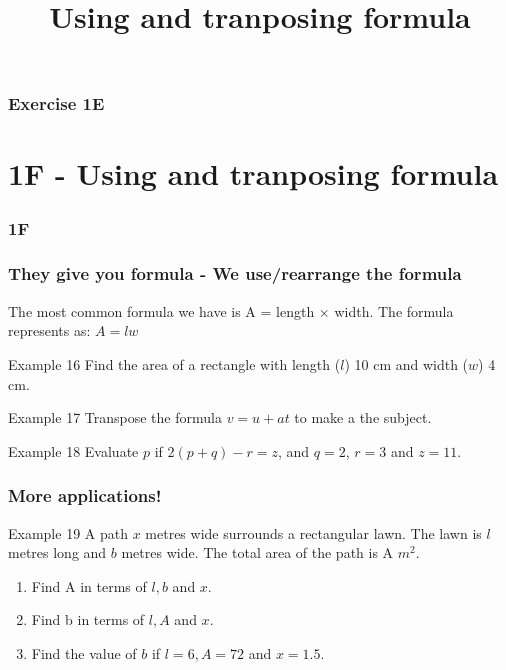 \documentclass{beamer}
\begin{document}
\begin{frame}
    \frametitle{Exercise 1E}
\end{frame}


\section{1F - Using and tranposing formula}
\begin{frame}
    \frametitle{1F}
    \begin{center}
        \title{Using and tranposing formula}
        \maketitle
    \end{center}
\end{frame}

\begin{frame}[t]
    \frametitle{They give you formula - We use/rearrange the formula}
    The most common formula we have is A = length $\times$ width. The formula represents as: $A = lw$
    \begin{block}{Example 16}
        Find the area of a rectangle with length ($l$) 10 cm and width ($w$) 4 cm.
    \end{block}
    \begin{block}{Example 17}
        Transpose the formula $v = u + at$ to make a the subject.
    \end{block}
    \begin{block}{Example 18}
        Evaluate $p$ if $2(p + q)-r = z$, and $q = 2$, $r = 3$ and $z = 11$.
    \end{block}
\end{frame}

\begin{frame}[t]
    \frametitle{More applications!}
    \begin{block}{Example 19}
        A path $x$ metres wide surrounds a rectangular lawn. The lawn is $l$ metres long and $b$ metres wide. The total area of the path is A $m^2$.
        \begin{enumerate}
            \item Find A in terms of $l, b$ and $x$.
            \item Find b in terms of $l, A$ and $x$.
            \item Find the value of $b$ if $l = 6, A = 72$ and $x = 1.5$.
        \end{enumerate}
    \end{block}
\end{frame}
\end{document}
